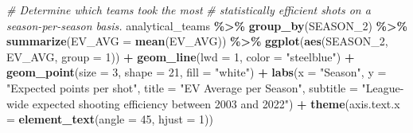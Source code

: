 \documentclass[
  12pt,
  a4paper,
]{article}
\newenvironment{Shaded}{\begin{snugshade}}{\end{snugshade}}
\newcommand{\AttributeTok}[1]{\textcolor[rgb]{0.13,0.29,0.53}{#1}}
\newcommand{\CommentTok}[1]{\textcolor[rgb]{0.56,0.35,0.01}{\textit{#1}}}
\newcommand{\DecValTok}[1]{\textcolor[rgb]{0.00,0.00,0.81}{#1}}
\newcommand{\FunctionTok}[1]{\textcolor[rgb]{0.13,0.29,0.53}{\textbf{#1}}}
\newcommand{\NormalTok}[1]{#1}
\newcommand{\SpecialCharTok}[1]{\textcolor[rgb]{0.81,0.36,0.00}{\textbf{#1}}}
\newcommand{\StringTok}[1]{\textcolor[rgb]{0.31,0.60,0.02}{#1}}
\begin{document}
\begin{Shaded}
\begin{Highlighting}[]
\CommentTok{\# Determine which teams took the most}
\CommentTok{\# statistically efficient shots on a season{-}per{-}season basis.}
\NormalTok{analytical\_teams }\SpecialCharTok{\%\textgreater{}\%}
  \FunctionTok{group\_by}\NormalTok{(SEASON\_2) }\SpecialCharTok{\%\textgreater{}\%}
  \FunctionTok{summarize}\NormalTok{(}\AttributeTok{EV\_AVG =} \FunctionTok{mean}\NormalTok{(EV\_AVG)) }\SpecialCharTok{\%\textgreater{}\%}
  \FunctionTok{ggplot}\NormalTok{(}\FunctionTok{aes}\NormalTok{(SEASON\_2, EV\_AVG, }\AttributeTok{group =} \DecValTok{1}\NormalTok{)) }\SpecialCharTok{+}
  \FunctionTok{geom\_line}\NormalTok{(}\AttributeTok{lwd =} \DecValTok{1}\NormalTok{, }\AttributeTok{color =} \StringTok{"steelblue"}\NormalTok{) }\SpecialCharTok{+}
  \FunctionTok{geom\_point}\NormalTok{(}\AttributeTok{size =} \DecValTok{3}\NormalTok{, }\AttributeTok{shape =} \DecValTok{21}\NormalTok{, }\AttributeTok{fill =} \StringTok{"white"}\NormalTok{) }\SpecialCharTok{+}
  \FunctionTok{labs}\NormalTok{(}\AttributeTok{x =} \StringTok{"Season"}\NormalTok{, }\AttributeTok{y =} \StringTok{"Expected points per shot"}\NormalTok{, }
       \AttributeTok{title =} \StringTok{"EV Average per Season"}\NormalTok{,}
       \AttributeTok{subtitle =} \StringTok{"League{-}wide expected shooting}
\StringTok{                   efficiency between 2003 and 2022"}\NormalTok{) }\SpecialCharTok{+}
  \FunctionTok{theme}\NormalTok{(}\AttributeTok{axis.text.x =} \FunctionTok{element\_text}\NormalTok{(}\AttributeTok{angle =} \DecValTok{45}\NormalTok{, }\AttributeTok{hjust =} \DecValTok{1}\NormalTok{))}


\end{Highlighting}
\end{Shaded}
\end{document}
